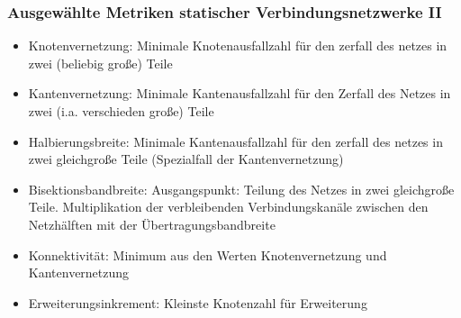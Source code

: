 \subsubsection{Ausgewählte Metriken statischer Verbindungsnetzwerke II}
\begin{itemize}
	\item Knotenvernetzung: Minimale Knotenausfallzahl für den zerfall des netzes in zwei (beliebig große) Teile
	\item Kantenvernetzung: Minimale Kantenausfallzahl für den Zerfall des Netzes in zwei (i.a. verschieden große) Teile
	\item Halbierungsbreite: Minimale Kantenausfallzahl für den zerfall des netzes in zwei gleichgroße Teile (Spezialfall der Kantenvernetzung)
	\item Bisektionsbandbreite: Ausgangspunkt: Teilung des Netzes in zwei gleichgroße Teile. Multiplikation der verbleibenden Verbindungskanäle zwischen den Netzhälften mit der Übertragungsbandbreite
	\item Konnektivität: Minimum aus den Werten Knotenvernetzung und Kantenvernetzung
	\item Erweiterungsinkrement: Kleinste Knotenzahl für Erweiterung
\end{itemize}